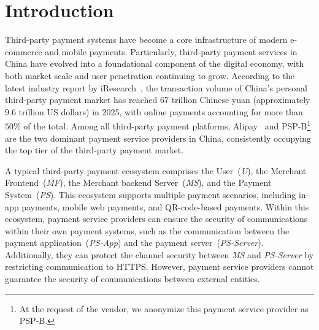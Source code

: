 \section{Introduction}

Third-party payment systems have become a core infrastructure of modern e-commerce and mobile payments.
Particularly, third-party payment services in China have evolved into a foundational component of the digital economy, with both market scale and user penetration continuing to grow.
According to the latest industry report by iResearch~\cite{Iresearch2025ChinaThirdPartyPayment}, 
the transaction volume of China's personal third-party payment market has reached 67 trillion Chinese yuan (approximately 9.6 trillion US dollars) in 2025, 
with online payments accounting for more than $50\%$ of the total.
Among all third-party payment platforms, 
Alipay~\cite{alipay2026official} and PSP-B\footnote{At the request of the vendor, we anonymize this payment service provider as PSP-B.} are the two dominant payment service providers in China, consistently occupying the top tier of the third-party payment market.

A typical third-party payment ecosystem comprises the User~(\emph{U}), the Merchant Frontend~(\emph{MF}), the Merchant backend Server~(\emph{MS}), and the Payment System~(\emph{PS}).
This ecosystem supports multiple payment scenarios, including in-app payments, mobile web payments, and QR-code-based payments.
Within this ecosystem, payment service providers can ensure the security of communications within their own payment systems, 
such as the communication between the payment application~(\emph{PS-App}) and the payment server~(\emph{PS-Server}).
Additionally, they can protect the channel security between \emph{MS} and \emph{PS-Server} by restricting communication to HTTPS.
However, payment service providers cannot guarantee the security of communications between external entities.


